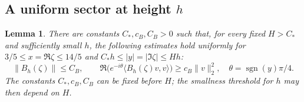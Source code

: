 \documentclass[11pt,a4paper]{article}
\DeclareMathOperator{\sgn}{sgn}
\newtheorem{lemma}[lemma]{Lemma}
\theoremstyle{remark}
\numberwithin{equation}{section}
\begin{document}
\subsection{A uniform sector at height \texorpdfstring{$h$}{h}}
\begin{lemma}\label{lem:sector}
There are constants $C_*,c_B,C_B>0$ such that, for every fixed $H>C_*$
and sufficiently small $h$, the following estimates hold uniformly for
$3/5\le x=\Re\zeta\le14/5$ and $C_*h\le|y|=|\Im\zeta|\le Hh$:
\begin{equation}\label{eq:sector-operator}
 \|B_h(\zeta)\|\le C_B,\qquad
 \Re\big(e^{-i\theta}\langle B_h(\zeta)v,v\rangle\big)
 \ge c_B\|v\|_2^2,\quad \theta=\sgn(y)\pi/4.
\end{equation}
The constants $C_*,c_B,C_B$ can be fixed before $H$; the smallness
threshold for $h$ may then depend on $H$.
\end{lemma}
\end{document}
